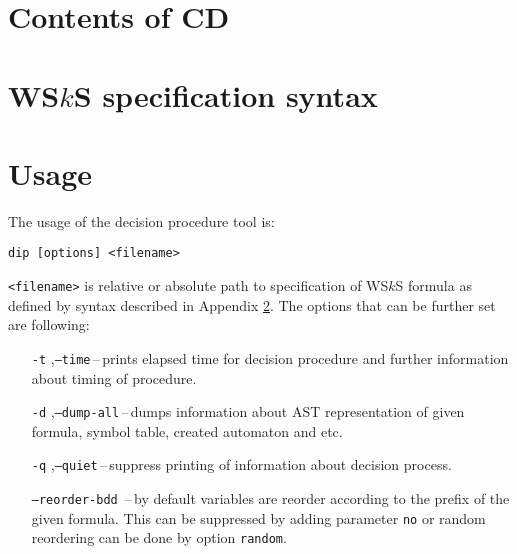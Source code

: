 \chapter{Contents of CD}
\chapter{WS$k$S specification syntax}\label{syntax}
\chapter{Usage}
The usage of the decision procedure tool is:
\begin{center}
 \texttt{dip [options] <filename>}
\end{center}
\texttt{<filename>} is relative or absolute path to specification of WS$k$S
formula as defined by syntax described in Appendix \ref{syntax}. The options
that can be further set are following:
\begin{itemize}
  \item[\texttt{-t}],\texttt{--time}\,--\,prints elapsed time for decision
  procedure and further information about timing of procedure.
  \item[\texttt{-d}],\texttt{--dump-all}\,--\,dumps information about AST
  representation of given formula, symbol table, created automaton and etc.
  \item[\texttt{-q}],\texttt{--quiet}\,--\,suppress printing of information
  about decision process.
  \item[\texttt{--reorder-bdd}]\,--\,by default variables are reorder according
  to the prefix of the given formula. This can be suppressed by adding parameter
  \texttt{no} or random reordering can be done by option \texttt{random}.
\end{itemize}

